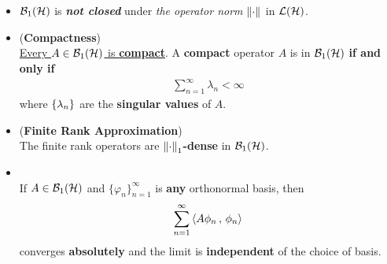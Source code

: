 \documentclass[11pt]{article}
\begin{document}
\begin{itemize}
\item \begin{remark}
${\mathcal B}_1({\mathcal H})$ is \emph{\textbf{not closed}} under \emph{the operator norm} $\left\|\cdot\right\|_{}$ in ${\mathcal L}({\mathcal H})$.
\end{remark}

\item \begin{proposition} (\textbf{Compactness}) \citep{reed1980methods}\\
\underline{Every $A \in {\mathcal B}_1({\mathcal H})$ is \textbf{compact}}. A \textbf{compact} operator $A$ is in ${\mathcal B}_1({\mathcal H})$ \textbf{if and only if}
\begin{align*}
\sum_{n=1}^{\infty}\lambda_n < \infty
\end{align*}
where $\left\{\lambda_n\right\}$ are the \textbf{singular values} of $A$. 
\end{proposition}

\item \begin{corollary} (\textbf{Finite Rank Approximation})  \citep{reed1980methods}\\
The finite rank operators are \textbf{$\left\|\cdot\right\|_{1}$-dense} in ${\mathcal B}_1({\mathcal H})$. 
\end{corollary}

\item \begin{proposition} \citep{reed1980methods}\\
If $A \in {\mathcal B}_1({\mathcal H})$  and  $\{\varphi_n\}_{n=1}^{\infty}$ is \textbf{any} orthonormal basis, then 
\begin{align*}
 \sum_{n=1}^{\infty}\left\langle A\phi_n\,,\, \phi_n \right\rangle
\end{align*} converges \textbf{absolutely} and the limit is \textbf{independent} of the choice of basis. 
\end{proposition}
\end{itemize}
\end{document}
